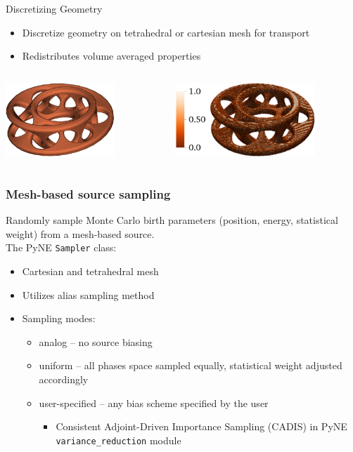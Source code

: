 \documentclass[xcolor=x11names,compress]{beamer}
\begin{document}
\begin{frame}{Discretizing Geometry}
    \begin{itemize}
        \item Discretize geometry on tetrahedral or cartesian mesh for transport
        \item Redistributes volume averaged properties
    \end{itemize}
    \begin{columns}
        \begin{column}{0.45\textwidth}
            \includegraphics[height=1.1in,clip]{mobius_cad.png}
  	    \end{column}
 	    \begin{column}{0.45\textwidth}
            \includegraphics[height=1.1in,clip]{mobius_mesh.png}
        \end{column}
    \end{columns}
\end{frame}

\begin{frame}
\frametitle{Mesh-based source sampling}

Randomly sample Monte Carlo birth parameters (position, energy, statistical weight) from a mesh-based source.\\
\vspace{0.3cm}
The PyNE \texttt{Sampler} class:
\begin{itemize}
\item{Cartesian and tetrahedral mesh}
\item{Utilizes alias sampling method \cite{smith_analysis_2005}}
\item{Sampling modes:}
  \begin{itemize}
  \item{analog -- no source biasing}
  \item{uniform -- all phases space sampled equally, statistical weight adjusted accordingly}
  \item{user-specified -- any bias scheme specified by the user}
    \begin{itemize}
    \item{Consistent Adjoint-Driven Importance Sampling (CADIS) in PyNE \texttt{variance\_reduction} module}
    \end{itemize}
  \end{itemize}
\end{itemize}
\end{frame}
\end{document}
